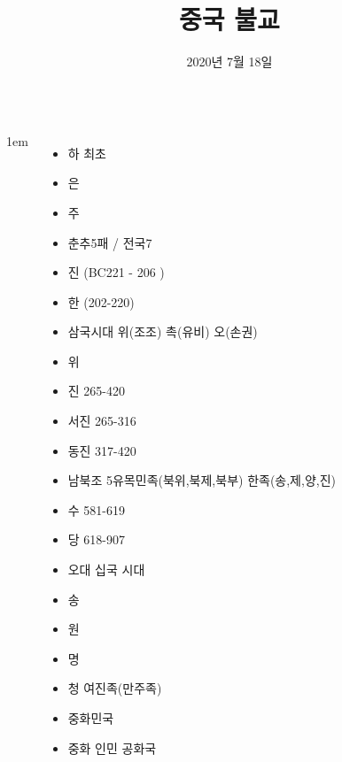 \documentclass[25pt, a1paper ]{tikzposter}
\title{ 중국 불교 }
\author{ 2020년 7월  18일 }
\begin{document}
	\maketitle



	\begin{columns}


			{
					\setlength{\leftmargini}{2em}
					\setlength{\labelsep} {1em}
					\begin{itemize}
					\item 하 최초
					\item 은
					\item 주
					\item 춘추5패 / 전국7
					\item 진 (BC221 - 206 )
					\item 한 (202-220)
					\item 삼국시대  위(조조) 촉(유비) 오(손권)
					\item 위

					\item 진 265-420
					\item 서진 265-316
					\item 동진 317-420

					\item 남북조 5유목민족(북위,북제,북부) 한족(송,제,양,진)
					\item 수 581-619
					\item 당 618-907
					\item 오대 십국 시대

					\item 송
					\item 원
					\item 명
					\item 청 여진족(만주족)
					\item 중화민국
					\item 중화 인민 공화국
					\end{itemize}
			}



\end{columns}
\end{document}
